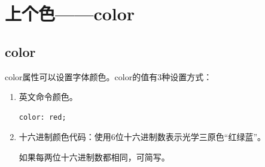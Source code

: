 \newpage

\section{上个色——color}

\subsection{color}

color属性可以设置字体颜色。color的值有3种设置方式：

\begin{enumerate}
	\item 英文命令颜色。 \\
	      \begin{lstlisting}[style=htmlcssjs]
color: red;
    \end{lstlisting}

	\item 十六进制颜色代码：使用6位十六进制数表示光学三原色“红绿蓝”。
	      \begin{table}[H]
		      \centering
		      \caption{颜色代码}
	      \end{table}
	      如果每两位十六进制数都相同，可简写。
	      \begin{table}[H]
		      \centering
		      \caption{常见颜色代码}
	      \end{table}


\end{enumerate}
